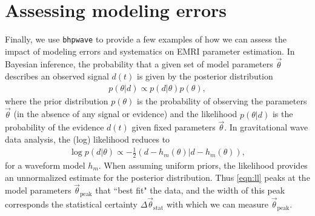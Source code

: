 \documentclass[%
 reprint,
 nofootinbib,
 amsmath,amssymb,
 aps,
 prd,
]{revtex4-2}
\begin{document}




\section{Assessing modeling errors}
\label{sec:errors}

Finally, we use \texttt{bhpwave} to provide a few examples of how we can assess the impact of modeling errors and systematics on EMRI parameter estimation. In Bayesian inference, the probability that a given set of model parameters $\vec{\theta}$ describes an observed signal $d(t)$ is given by the posterior distribution
\begin{align}
    p(\theta | d) \propto p(d|\theta) p(\theta),
\end{align}
where the prior distribution $p(\theta)$ is the probability of observing the parameters $\vec{\theta}$ (in the absence of any signal or evidence) and the likelihood $p(\theta |d)$ is the probability of the evidence $d(t)$ given fixed parameters $\vec{\theta}$. In gravitational wave data analysis, the (log) likelihood reduces to \cite{Whit53}
\begin{align} \label{eqn:ll}
    \log p(d|\theta) \propto -\frac{1}{2}(d - h_m(\theta)| d- h_m(\theta)),
\end{align}
for a waveform model $h_m$. When assuming uniform priors, the likelihood provides an unnormalized estimate for the posterior distribution. Thus \eqref{eqn:ll} peaks at the model parameters $\vec{\theta}_\mathrm{peak}$ that ``best fit" the data, and the width of this peak corresponds the statistical certainty $\Delta \vec{\theta}_\mathrm{stat}$ with which we can measure $\vec{\theta}_\mathrm{peak}$. 
\end{document}
